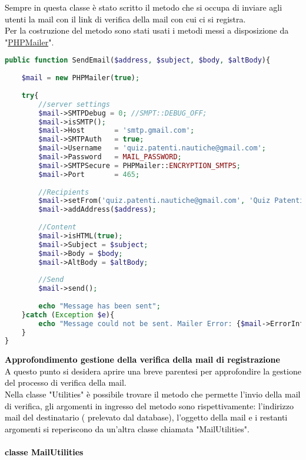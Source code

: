 \raggedright
\textcolor{black}{Sempre in questa classe è stato scritto il metodo che si occupa di inviare agli utenti la mail con il link di verifica della mail con cui ci si registra.\\
Per la costruzione del metodo sono stati usati i metodi messi a disposizione da "\href{https://github.com/PHPMailer/PHPMailer}{PHPMailer}"}.

\begin{lstlisting}[language=php]
public function SendEmail($address, $subject, $body, $altBody){
	
	$mail = new PHPMailer(true);
	
	try{
		//server settings
		$mail->SMTPDebug = 0; //SMPT::DEBUG_OFF;
		$mail->isSMTP();
		$mail->Host       = 'smtp.gmail.com';
		$mail->SMTPAuth   = true;
		$mail->Username   = 'quiz.patenti.nautiche@gmail.com';
		$mail->Password   = MAIL_PASSWORD;
		$mail->SMTPSecure = PHPMailer::ENCRYPTION_SMTPS;
		$mail->Port       = 465;
		
		//Recipients
		$mail->setFrom('quiz.patenti.nautiche@gmail.com', 'Quiz Patenti Nautiche');
		$mail->addAddress($address);
		
		//Content
		$mail->isHTML(true);
		$mail->Subject = $subject;
		$mail->Body = $body;
		$mail->AltBody = $altBody;
		
		//Send
		$mail->send();
		
		echo "Message has been sent";
	}catch (Exception $e){
		echo "Message could not be sent. Mailer Error: {$mail->ErrorInfo}";
	}
}
\end{lstlisting}

\raggedright
\textcolor{black}{
\textbf{Approfondimento gestione della verifica della mail di registrazione}\\
A questo punto si desidera aprire una breve parentesi per approfondire la gestione del processo di verifica della mail.\\
Nella classe "Utilities" è possibile trovare il metodo che permette l'invio della mail di verifica, gli argomenti in ingresso del metodo sono rispettivamente: l'indirizzo mail del destinatario ( prelevato dal database), l'oggetto della mail e i restanti argomenti si reperiscono da un'altra classe chiamata "MailUtilities".}\\

\paragraph{\textcolor{black}{classe MailUtilities}}\leavevmode\\

